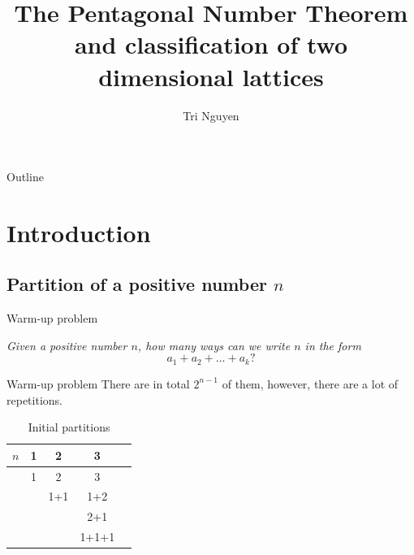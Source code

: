 \documentclass[pdf]{beamer}
\title[Classification of 2 lattices]{The Pentagonal Number Theorem and classification of two dimensional lattices}
\author{Tri Nguyen}
\begin{document}
\begin{frame}
    \titlepage
\end{frame}

\begin{frame}{Outline}
    \tableofcontents
\end{frame}

\section{Introduction}
\subsection{Partition of a positive number $n$}
\begin{frame}{Warm-up problem}
    \begin{center}
        \textit{Given a positive number $n$, how many ways can we write $n$ in the form}
        \[a_1+a_2+\ldots+a_k?\]
    \end{center}
\end{frame}

\begin{frame}{Warm-up problem}
    There are in total $2^{n-1}$ of them, however, there are a lot of repetitions.
    \begin{table}
        \begin{tabular}{l  c  c  c  c }
            $n$ & 1 & 2   & 3     \\
            \hline\pause
                & 1 & 2   & 3     \\
                &   & 1+1 & 1+2   \\
                &   &     & 2+1   \\
                &   &     & 1+1+1
        \end{tabular}
        \caption{Initial partitions}
    \end{table}
\end{frame}
\end{document}
